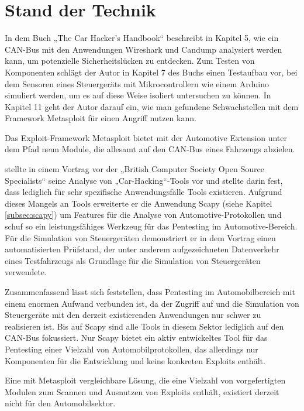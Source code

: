 \section{Stand der Technik}\label{sec:ziel}

In dem Buch „The Car Hacker’s Handbook“ beschreibt \cite{carhacker} in Kapitel 5, wie ein CAN-Bus mit den Anwendungen Wireshark und Candump analysiert werden kann, um potenzielle Sicherheitslücken zu entdecken. Zum Testen von Komponenten schlägt der Autor in Kapitel 7 des Buchs einen Testaufbau vor, bei dem Sensoren eines Steuergeräts mit Mikrocontrollern wie einem Arduino simuliert werden, um es auf diese Weise isoliert untersuchen zu können. In Kapitel 11 geht der Autor darauf ein, wie man gefundene Schwachstellen mit dem Framework Metasploit für einen Angriff nutzen kann. 

Das Exploit-Framework Metasploit bietet mit der Automotive Extension unter dem Pfad  neun Module, die allesamt auf den CAN-Bus eines Fahrzeugs abzielen. 

\cite{automotivepentestingos} stellte in einem Vortrag vor der „British Computer Society Open Source Specialists“ seine Analyse von „Car-Hacking“-Tools vor und stellte darin fest, dass lediglich für sehr spezifische Anwendungsfälle Tools existieren. Aufgrund dieses Mangels an Tools erweiterte er die Anwendung Scapy (siehe Kapitel \ref{subsec:scapy}) um Features für die Analyse von Automotive-Protokollen und schuf so ein leistungsfähiges Werkzeug für das Pentesting im Automotive-Bereich. Für die Simulation von Steuergeräten demonstriert er in dem Vortrag einen automatisierten Prüfstand, der unter anderem aufgezeichneten Datenverkehr eines Testfahrzeugs als Grundlage für die Simulation von Steuergeräten verwendete.

Zusammenfassend lässt sich feststellen, dass Pentesting im Automobilbereich mit einem enormen Aufwand verbunden ist, da der Zugriff auf und die Simulation von Steuergeräte mit den derzeit existierenden Anwendungen nur schwer zu realisieren ist. Bis auf Scapy sind alle Tools in diesem Sektor lediglich auf den CAN-Bus fokussiert. Nur Scapy bietet ein aktiv entwickeltes Tool für das Pentesting einer Vielzahl von Automobilprotokollen, das allerdings nur Komponenten für die Entwicklung und keine konkreten Exploits enthält. 

Eine mit Metasploit vergleichbare Lösung, die eine Vielzahl von vorgefertigten Modulen zum Scannen und Ausnutzen von Exploits enthält, existiert derzeit nicht für den Automobilsektor. 

